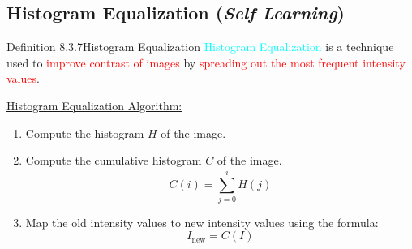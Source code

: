 \documentclass{book}
\begin{document}
\subsection{Histogram Equalization (\textit{Self Learning})}
\begin{defBox}{Definition 8.3.7}{Histogram Equalization}
    \textcolor{cyan}{Histogram Equalization} is a technique used to \textcolor{red}{improve contrast of images} by \textcolor{red}{spreading out the most frequent intensity values}.
\end{defBox}
\uline{Histogram Equalization Algorithm:}
\begin{enumerate}
    \item Compute the histogram $H$ of the image.
    \item Compute the cumulative histogram $C$ of the image.
    \[
        C(i) = \sum_{j=0}^{i} H(j)
    \]
    \item Map the old intensity values to new intensity values using the formula:
    \[
        I_{\text{new}} = C(I)
    \]
\end{enumerate}
\end{document}

